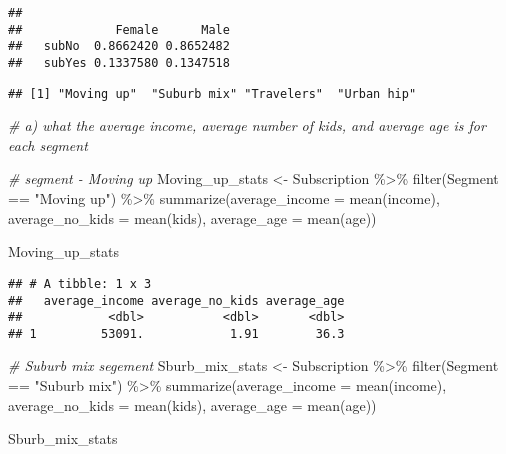 \documentclass[
]{article}
\newenvironment{Shaded}{\begin{snugshade}}{\end{snugshade}}
\newcommand{\AttributeTok}[1]{\textcolor[rgb]{0.77,0.63,0.00}{#1}}
\newcommand{\CommentTok}[1]{\textcolor[rgb]{0.56,0.35,0.01}{\textit{#1}}}
\newcommand{\FunctionTok}[1]{\textcolor[rgb]{0.00,0.00,0.00}{#1}}
\newcommand{\NormalTok}[1]{#1}
\newcommand{\OtherTok}[1]{\textcolor[rgb]{0.56,0.35,0.01}{#1}}
\newcommand{\SpecialCharTok}[1]{\textcolor[rgb]{0.00,0.00,0.00}{#1}}
\newcommand{\StringTok}[1]{\textcolor[rgb]{0.31,0.60,0.02}{#1}}
\begin{document}
\begin{verbatim}
##         
##             Female      Male
##   subNo  0.8662420 0.8652482
##   subYes 0.1337580 0.1347518
\end{verbatim}

\begin{Shaded}
\end{Shaded}

\begin{verbatim}
## [1] "Moving up"  "Suburb mix" "Travelers"  "Urban hip"
\end{verbatim}

\begin{Shaded}
\begin{Highlighting}[]
\CommentTok{\# a) what the average income, average number of kids, and average age is for each segment}

\CommentTok{\# segment {-} Moving up}
\NormalTok{Moving\_up\_stats }\OtherTok{\textless{}{-}}\NormalTok{ Subscription }\SpecialCharTok{\%\textgreater{}\%}
  \FunctionTok{filter}\NormalTok{(Segment }\SpecialCharTok{==} \StringTok{"Moving up"}\NormalTok{) }\SpecialCharTok{\%\textgreater{}\%}
  \FunctionTok{summarize}\NormalTok{(}\AttributeTok{average\_income =} \FunctionTok{mean}\NormalTok{(income), }\AttributeTok{average\_no\_kids =} \FunctionTok{mean}\NormalTok{(kids), }
            \AttributeTok{average\_age =} \FunctionTok{mean}\NormalTok{(age))}

\NormalTok{Moving\_up\_stats}
\end{Highlighting}
\end{Shaded}

\begin{verbatim}
## # A tibble: 1 x 3
##   average_income average_no_kids average_age
##            <dbl>           <dbl>       <dbl>
## 1         53091.            1.91        36.3
\end{verbatim}

\begin{Shaded}
\begin{Highlighting}[]
\CommentTok{\# Suburb mix segement}
\NormalTok{Sburb\_mix\_stats }\OtherTok{\textless{}{-}}\NormalTok{ Subscription }\SpecialCharTok{\%\textgreater{}\%}
  \FunctionTok{filter}\NormalTok{(Segment }\SpecialCharTok{==} \StringTok{"Suburb mix"}\NormalTok{) }\SpecialCharTok{\%\textgreater{}\%}
  \FunctionTok{summarize}\NormalTok{(}\AttributeTok{average\_income =} \FunctionTok{mean}\NormalTok{(income), }\AttributeTok{average\_no\_kids =} \FunctionTok{mean}\NormalTok{(kids), }
            \AttributeTok{average\_age =} \FunctionTok{mean}\NormalTok{(age))}

\NormalTok{Sburb\_mix\_stats}
\end{Highlighting}
\end{Shaded}
\end{document}
